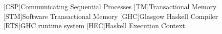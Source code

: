 \begin{acronym}[ACRONYM]
[CSP]{Communicating Sequential Processes}
[TM]{Transactional Memory}
[STM]{Software Transactional Memory}
[GHC]{Glasgow Haskell Compiler}
[RTS]{GHC runtime system}
[HEC]{Haskell Execution Context}
\end{acronym}
